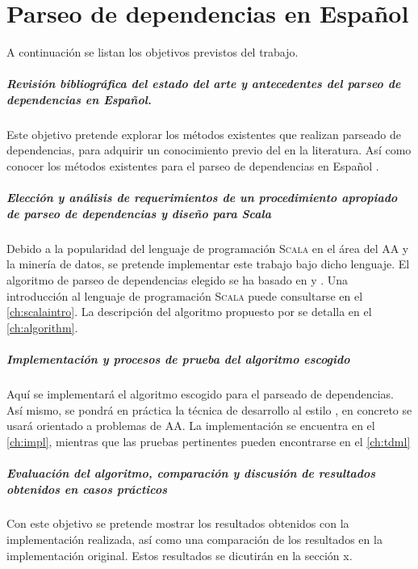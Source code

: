 \chapter{Parseo de dependencias en Español}\label{ch:goals}

A continuación se listan los objetivos previstos del trabajo.

\paragraph{Revisión bibliográfica del estado del arte y antecedentes del parseo
  de dependencias en Español.} Este objetivo pretende explorar los métodos
existentes que realizan parseado de dependencias, para adquirir un conocimiento
previo del  en la literatura. Así como conocer los
métodos existentes para el parseo de dependencias en Español
\cite{ballesteros2016}.

\paragraph{Elección y análisis de requerimientos de un procedimiento apropiado de
  parseo de dependencias y diseño para Scala}
Debido a la popularidad del lenguaje de programación \textsc{Scala} en el área
del \ac{AA} y la minería de datos, se pretende implementar este trabajo bajo
dicho lenguaje. El algoritmo de parseo de dependencias elegido se ha basado en
\citeauthor{yamada2003} \cite{yamada2003} y \citeauthor{rohit2016}
\cite{rohit2016}. Una introducción al lenguaje de programación \textsc{Scala}
puede consultarse en el \autoref{ch:scalaintro}. La descripción del algoritmo
propuesto por \citeauthor{yamada2003} se detalla en el \autoref{ch:algorithm}.

\paragraph{Implementación y procesos de prueba del algoritmo escogido}
Aquí se implementará el algoritmo escogido para el parseado de dependencias. Así
mismo, se pondrá en práctica la técnica de desarrollo al estilo
, en concreto se usará  orientado a
problemas de \ac{AA}. La implementación se encuentra en el \autoref{ch:impl},
mientras que las pruebas pertinentes pueden encontrarse en el \autoref{ch:tdml}

\paragraph{Evaluación del algoritmo, comparación y discusión de resultados
  obtenidos en casos prácticos}
Con este objetivo se pretende mostrar los resultados obtenidos con la
implementación realizada, así como una comparación de los resultados en la
implementación original. Estos resultados se dicutirán en la sección x.

